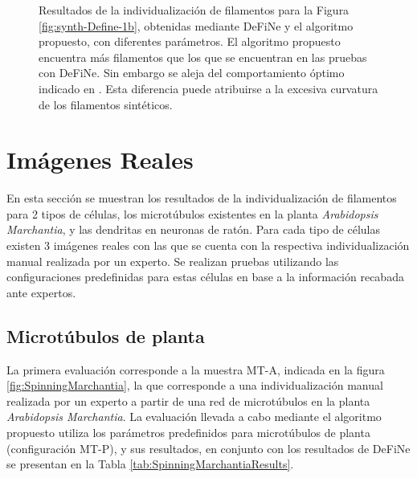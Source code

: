 \begin{figure}[h!]
    \caption[Resultados de la individualizaci\'on de filamentos para la Figura \ref{fig:synth-Define-1b}, obtenidas mediante DeFiNe y el algoritmo propuesto, con diferentes par\'ametros.]{Resultados de la individualizaci\'on de filamentos para la Figura \ref{fig:synth-Define-1b}, obtenidas mediante DeFiNe y el algoritmo propuesto, con diferentes par\'ametros. El algoritmo propuesto encuentra m\'as filamentos que los que se encuentran en las pruebas con DeFiNe. Sin embargo se aleja del comportamiento \'optimo indicado en \citet{breuer2015define}. Esta diferencia puede atribuirse a la excesiva curvatura de los filamentos sint\'eticos.}
    \label{fig:SynthDefine-Result}
\end{figure}
\clearpage
\newpage

\section{Im\'agenes Reales}

En esta secci\'on se muestran los resultados de la individualizaci\'on de filamentos para 2 tipos de c\'elulas, los microt\'ubulos existentes en la planta {\it Arabidopsis Marchantia}, y las dendritas en neuronas de rat\'on. Para cada tipo de c\'elulas existen 3 im\'agenes reales con las que se cuenta con la respectiva individualizaci\'on manual realizada por un experto. Se realizan pruebas utilizando las configuraciones predefinidas para estas c\'elulas en base a la informaci\'on recabada ante expertos.

\subsection{Microt\'ubulos de planta}
\label{subsec:mtTest}


La primera evaluaci\'on corresponde a la muestra MT-A, indicada en la figura \ref{fig:SpinningMarchantia}, la que corresponde a una individualizaci\'on manual realizada por un experto a partir de una red de microt\'ubulos en la planta {\it Arabidopsis Marchantia}. La evaluaci\'on llevada a cabo mediante el algoritmo propuesto utiliza los par\'ametros predefinidos para microt\'ubulos de planta (configuraci\'on MT-P), y sus resultados, en conjunto con los resultados de DeFiNe se presentan en la Tabla \ref{tab:SpinningMarchantiaResults}.

